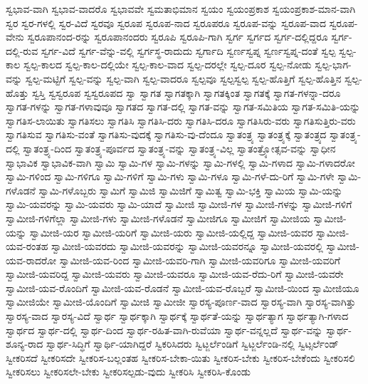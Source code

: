 {ಸ್ವಭಾವ-ವಾಗಿ
ಸ್ವಭಾವ-ವಾದರೊ
ಸ್ವಭಾವವೇ
ಸ್ವಮತಾಭಿಮಾನ
ಸ್ವಯಂ
ಸ್ವಯಂಪ್ರಕಾಶ
ಸ್ವಯಂಪ್ರಕಾಶ-ಮಾನ-ವಾಗಿ
ಸ್ವರ
ಸ್ವರ-ಗಳಲ್ಲಿ
ಸ್ವರ-ವಿದೆ
ಸ್ವರವೂ
ಸ್ವರೂಪ
ಸ್ವರೂಪ-ನಾದ
ಸ್ವರೂಪರೂ
ಸ್ವರೂಪ-ವನ್ನು
ಸ್ವರೂಪ-ವಾದ
ಸ್ವರೂಪ-ವೇನು
ಸ್ವರೂಪಾನಂದ-ರನ್ನು
ಸ್ವರೂಪಾನಂದರು
ಸ್ವರೂಪಿ
ಸ್ವರೂಪಿ-ಗಾಗಿ
ಸ್ವರ್ಗ
ಸ್ವರ್ಗದ
ಸ್ವರ್ಗ-ದಲ್ಲಿದ್ದರೂ
ಸ್ವರ್ಗ-ದಲ್ಲಿ-ರುವ
ಸ್ವರ್ಗ-ವಿದೆ
ಸ್ವರ್ಗ-ವೆನ್ನು-ವಲ್ಲಿ
ಸ್ವರ್ಗಸ್ಥ-ರಾದುದು
ಸ್ವರ್ಗಾದಿ
ಸ್ವರ್ಣಸ್ವಪ್ನ
ಸ್ವರ್ಣಸ್ವಪ್ನ-ದಂತೆ
ಸ್ವಲ್ಪ
ಸ್ವಲ್ಪ-ಕಾಲ
ಸ್ವಲ್ಪ-ಕಾಲದ
ಸ್ವಲ್ಪ-ಕಾಲ-ದಲ್ಲಿಯೇ
ಸ್ವಲ್ಪ-ಕಾಲ-ವಾದ
ಸ್ವಲ್ಪ-ದರಲ್ಲೇ
ಸ್ವಲ್ಪ-ದೂರ
ಸ್ವಲ್ಪ-ನೋಡು
ಸ್ವಲ್ಪ-ಭಾಗ-ವನ್ನು
ಸ್ವಲ್ಪ-ಮಟ್ಟಿಗೆ
ಸ್ವಲ್ಪ-ವನ್ನು
ಸ್ವಲ್ಪ-ವಾಗಿ
ಸ್ವಲ್ಪ-ವಾದರೂ
ಸ್ವಲ್ಪವೂ
ಸ್ವಲ್ಪಸ್ವಲ್ಪ
ಸ್ವಲ್ಪ-ಹೊತ್ತಿಗೆ
ಸ್ವಲ್ಪ-ಹೊತ್ತಿನ
ಸ್ವಲ್ಪ-ಹೊತ್ತು
ಸ್ವಸ್ತಿ
ಸ್ವಸ್ವರೂಪ
ಸ್ವಸ್ವರೂಪದ
ಸ್ವಾ
ಸ್ವಾಗತ
ಸ್ವಾಗತಕ್ಕಾಗಿ
ಸ್ವಾಗತಕ್ಕಿಂತ
ಸ್ವಾಗತಕ್ಕೆ
ಸ್ವಾಗತ-ಗಳನ್ನಾ-ದರೂ
ಸ್ವಾಗತ-ಗಳನ್ನು
ಸ್ವಾಗತ-ಗಳಾವುವೂ
ಸ್ವಾಗತದ
ಸ್ವಾಗತ-ದಲ್ಲಿ
ಸ್ವಾಗತ-ವನ್ನು
ಸ್ವಾಗತ-ಸಮಿತಿಯ
ಸ್ವಾಗತ-ಸಮಿತಿ-ಯನ್ನು
ಸ್ವಾಗತಿಸ-ಲಾಯಿತು
ಸ್ವಾಗತಿಸಲು
ಸ್ವಾಗತಿಸಿ
ಸ್ವಾಗತಿಸಿ-ದರು
ಸ್ವಾಗತಿಸಿ-ದರೂ
ಸ್ವಾಗತಿಸಿರು-ವರು
ಸ್ವಾಗತಿಸುತ್ತಿರು-ವರು
ಸ್ವಾಗತಿಸುವ
ಸ್ವಾಗತಿಸು-ವಂತೆ
ಸ್ವಾಗತಿಸು-ವುದಕ್ಕೆ
ಸ್ವಾಗತಿಸು-ವು-ದೆಂದೂ
ಸ್ವಾತಂತ್ರ್ಯ
ಸ್ವಾತಂತ್ರ್ಯಕ್ಕೆ
ಸ್ವಾತಂತ್ರ್ಯದ
ಸ್ವಾತಂತ್ರ್ಯ-ದಲ್ಲಿ
ಸ್ವಾತಂತ್ರ್ಯ-ದಿಂದ
ಸ್ವಾತಂತ್ರ್ಯ-ಪೂರ್ವದ
ಸ್ವಾತಂತ್ರ್ಯ-ವನ್ನು
ಸ್ವಾತಂತ್ರ್ಯ-ವಿಲ್ಲ
ಸ್ವಾತಂತ್ರ್ಯೋತ್ಸವ-ವನ್ನು
ಸ್ವಾಧೀನ
ಸ್ವಾಭಾವಿಕ
ಸ್ವಾಭಾವಿಕ-ವಾಗಿ
ಸ್ವಾಮಿ
ಸ್ವಾಮಿ-ಗಳ
ಸ್ವಾಮಿ-ಗಳನ್ನು
ಸ್ವಾಮಿ-ಗಳಲ್ಲಿ
ಸ್ವಾಮಿ-ಗಳಾದ
ಸ್ವಾಮಿ-ಗಳಾದರೋ
ಸ್ವಾಮಿ-ಗಳಿಂದ
ಸ್ವಾಮಿ-ಗಳಿಗೂ
ಸ್ವಾಮಿ-ಗಳಿಗೆ
ಸ್ವಾಮಿ-ಗಳು
ಸ್ವಾಮಿ-ಗಳೂ
ಸ್ವಾಮಿ-ಗಳೆ-ದು-ರಿಗೆ
ಸ್ವಾಮಿ-ಗಳೇ
ಸ್ವಾಮಿ-ಗಳೊಡನೆ
ಸ್ವಾಮಿ-ಗಳೊಬ್ಬರು
ಸ್ವಾಮಿಗೆ
ಸ್ವಾಮಿಜಿ
ಸ್ವಾಮಿಜಿಗೆ
ಸ್ವಾಮಿತ್ವ
ಸ್ವಾಮಿ-ಭಕ್ತಿ
ಸ್ವಾಮಿಯ
ಸ್ವಾಮಿ-ಯನ್ನು
ಸ್ವಾಮಿ-ಯವರನ್ನು
ಸ್ವಾಮಿ-ಯವರು
ಸ್ವಾಮಿ-ಯಾದೆ
ಸ್ವಾಮೀಜಿ
ಸ್ವಾಮೀಜಿ-ಗಳ
ಸ್ವಾಮೀಜಿ-ಗಳನ್ನು
ಸ್ವಾಮೀಜಿ-ಗಳಿಗೆ
ಸ್ವಾಮೀಜಿ-ಗಳಿಗೆಲ್ಲಾ
ಸ್ವಾಮೀಜಿ-ಗಳು
ಸ್ವಾಮೀಜಿ-ಗಳೊಡನೆ
ಸ್ವಾಮೀಜಿಗೂ
ಸ್ವಾಮೀಜಿಗೆ
ಸ್ವಾಮೀಜಿಯ
ಸ್ವಾಮೀಜಿ-ಯನ್ನು
ಸ್ವಾಮೀಜಿ-ಯರ
ಸ್ವಾಮೀಜಿ-ಯರಿಗೆ
ಸ್ವಾಮೀಜಿ-ಯರು
ಸ್ವಾಮೀಜಿ-ಯಲ್ಲಿದ್ದ
ಸ್ವಾಮೀಜಿ-ಯವರ
ಸ್ವಾಮೀಜಿ-ಯವ-ರಂತಹ
ಸ್ವಾಮೀಜಿ-ಯವರದು
ಸ್ವಾಮೀಜಿ-ಯವರನ್ನು
ಸ್ವಾಮೀಜಿ-ಯವರನ್ನೂ
ಸ್ವಾಮೀಜಿ-ಯವರಲ್ಲಿ
ಸ್ವಾಮೀಜಿ-ಯವ-ರಾದರೋ
ಸ್ವಾಮೀಜಿ-ಯವ-ರಿಂದ
ಸ್ವಾಮೀಜಿ-ಯವರಿ-ಗಾಗಿ
ಸ್ವಾಮೀಜಿ-ಯವರಿಗೂ
ಸ್ವಾಮೀಜಿ-ಯವರಿಗೆ
ಸ್ವಾಮೀಜಿ-ಯವರಿದ್ದ
ಸ್ವಾಮೀಜಿ-ಯವರು
ಸ್ವಾಮೀಜಿ-ಯವರೂ
ಸ್ವಾಮೀಜಿ-ಯವ-ರೆದು-ರಿಗೆ
ಸ್ವಾಮೀಜಿ-ಯವರೇ
ಸ್ವಾಮೀಜಿ-ಯವ-ರೊಂದಿಗೆ
ಸ್ವಾಮೀಜಿ-ಯವ-ರೊಡನೆ
ಸ್ವಾಮೀಜಿ-ಯವ-ರೊಬ್ಬರೆ
ಸ್ವಾಮೀಜಿ-ಯಿಂದ
ಸ್ವಾಮೀಜಿಯೂ
ಸ್ವಾಮೀಜಿಯೇ
ಸ್ವಾಮೀಜಿ-ಯೊಂದಿಗೆ
ಸ್ವಾಮೀಜಿ
ಸ್ವಾಮೀಜೀ
ಸ್ವಾರಸ್ಯ-ಪೂರ್ಣ-ವಾದ
ಸ್ವಾರಸ್ಯ-ವಾಗಿ
ಸ್ವಾರಸ್ಯ-ವಾಗಿತ್ತು
ಸ್ವಾರಸ್ಯ-ವಾದ
ಸ್ವಾರಸ್ಯ-ವಿದೆ
ಸ್ವಾರ್ಥ
ಸ್ವಾರ್ಥಕ್ಕಾಗಿ
ಸ್ವಾರ್ಥಕ್ಕೆ
ಸ್ವಾರ್ಥತೆ-ಯನ್ನು
ಸ್ವಾರ್ಥತ್ಯಾಗ
ಸ್ವಾರ್ಥತ್ಯಾಗಿ-ಗಳಾದ
ಸ್ವಾರ್ಥದ
ಸ್ವಾರ್ಥ-ದಲ್ಲಿ
ಸ್ವಾರ್ಥ-ದಿಂದ
ಸ್ವಾರ್ಥ-ರಹಿತ-ವಾಗಿ-ರುವೆಯಾ
ಸ್ವಾರ್ಥ-ವನ್ನಲ್ಲದೆ
ಸ್ವಾರ್ಥ-ವನ್ನು
ಸ್ವಾರ್ಥ-ಶೂನ್ಯ-ರಾದ
ಸ್ವಾರ್ಥ-ಸಿದ್ಧಿಗೆ
ಸ್ವಾರ್ಥಿ-ಯಾಗಿದ್ದರೆ
ಸ್ವಿಕರಿಸಿದರು
ಸ್ವಿಟ್ಜರ್ಲೆಂಡಿಗೆ
ಸ್ವಿಟ್ಜರ್ಲೆಂಡಿ-ನಲ್ಲಿ
ಸ್ವಿಟ್ಸರ್ಲೆಂಡ್
ಸ್ವೀಕರಿಸದೆ
ಸ್ವೀಕರಿಸದೇ
ಸ್ವೀಕರಿಸ-ಬಲ್ಲಂತಹ
ಸ್ವೀಕರಿಸ-ಬೇಕಾ-ಯಿತು
ಸ್ವೀಕರಿಸ-ಬೇಕು
ಸ್ವೀಕರಿಸ-ಬೇಕೆಂದು
ಸ್ವೀಕರಿಸಲಿ
ಸ್ವೀಕರಿಸಲು
ಸ್ವೀಕರಿಸಲೇ-ಬೇಕು
ಸ್ವೀಕರಿಸಲ್ಪಡು-ವುದು
ಸ್ವೀಕರಿಸಿ
ಸ್ವೀಕರಿಸಿ-ಕೊಂಡು
}
